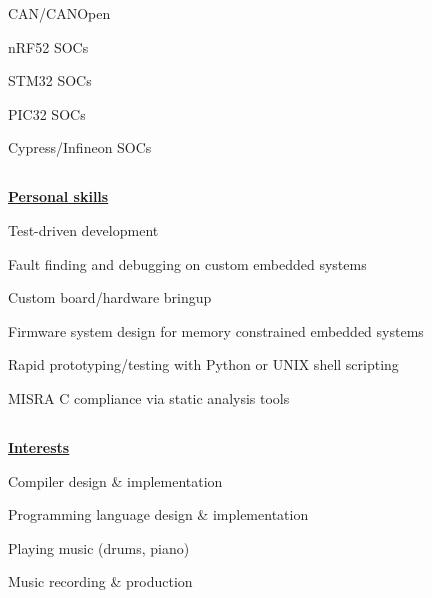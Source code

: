 \documentclass[6pt]{article}
\begin{document}
\begin{minipage}{13em}
{CAN/CANOpen

nRF52 SOCs

STM32 SOCs

PIC32 SOCs

Cypress/Infineon SOCs}

\subsection*{}
{\underline{\textbf{Personal skills}}}

\noindent
\begin{flushleft}
\begin{itemize}
{\small
    \item Test-driven development
    \item Fault finding and debugging on custom embedded systems
    \item Custom board/hardware bringup
    \item Firmware system design for memory constrained embedded systems
    \item Rapid prototyping/testing with Python or UNIX shell scripting
    \item MISRA C compliance via static analysis tools
}
\end{itemize}
\end{flushleft}

\subsection*{}
{\underline{\textbf{Interests}}}

\noindent
\begin{flushleft}
\begin{itemize}
{\small
    \item Compiler design \& implementation
    \item Programming language design \& implementation
    \item Playing music (drums, piano)
    \item Music recording \& production
}
\end{itemize}
\end{flushleft}
\end{minipage}
\hspace*{2em}
%
\end{document}
